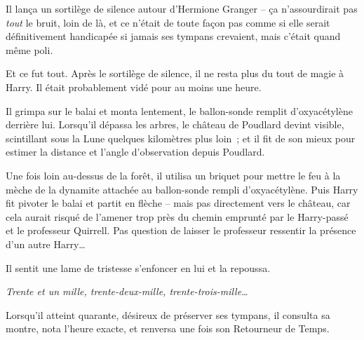 Il lança un sortilège de silence autour d'Hermione Granger -- ça n'assourdirait pas \emph{tout} le bruit, loin de là, et ce n'était de toute façon pas comme si elle serait définitivement handicapée si jamais ses tympans crevaient, mais c'était quand même poli.

Et ce fut tout. Après le sortilège de silence, il ne resta plus du tout de magie à Harry. Il était probablement vidé pour au moins une heure.

Il grimpa sur le balai et monta lentement, le ballon-sonde remplit d'oxyacétylène derrière lui. Lorsqu'il dépassa les arbres, le château de Poudlard devint visible, scintillant sous la Lune quelques kilomètres plus loin~; et il fit de son mieux pour estimer la distance et l'angle d'observation depuis Poudlard.

Une fois loin au-dessus de la forêt, il utilisa un briquet pour mettre le feu à la mèche de la dynamite attachée au ballon-sonde rempli d'oxyacétylène. Puis Harry fit pivoter le balai et partit en flèche -- mais pas directement vers le château, car cela aurait risqué de l'amener trop près du chemin emprunté par le Harry-passé et le professeur Quirrell. Pas question de laisser le professeur ressentir la présence d'un autre Harry…

Il sentit une lame de tristesse s'enfoncer en lui et la repoussa.

\emph{Trente et un mille, trente-deux-mille, trente-trois-mille…}

Lorsqu'il atteint quarante, désireux de préserver ses tympans, il consulta sa montre, nota l'heure exacte, et renversa une fois son Retourneur de Temps.
